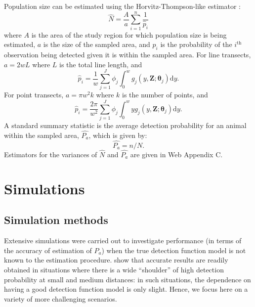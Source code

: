 \documentclass[useAMS,referee,usenatbib]{biom}
\begin{document}
Population size can be estimated using the Horvitz-Thompson-like estimator \citep{Marques:2003vb}:
\begin{equation}
\label{e:popsize}
\hat{N}=\frac{A}{a}\sum_{i=1}^n \frac{1}{\hat {p}_i}
\end{equation}
where $A$ is the area of the study region for which population size is being estimated, $a$ is the size of the sampled area, and $p_i$ is the probability of the $i^\text{th}$ observation being detected given it is within the sampled area.  For line transects, $a=2wL$ where $L$ is the total line length, and 
\begin{equation*}
\hat{p}_i = \frac{1}{w} \sum_{j=1}^J \phi_j \int_0^w  g_j(y,\mathbf{Z}; \bm{\theta}_j) \text{d}y.
\end{equation*}
For point transects, $a=\pi w^2 k$ where $k$ is the number of points, and 
\begin{equation*}
\hat{p}_i = \frac{2\pi}{w^2} \sum_{j=1}^J \phi_j \int_0^w  y g_j(y,\mathbf{Z}; \bm{\theta}_j) \text{d}y.
\end{equation*}
A standard summary statistic is the average detection probability for an animal within the sampled area, $\hat{P_a}$, which is given by:
\begin{equation*}
\hat{P_a} = n/N.
\end{equation*}
Estimators for the variances of $\hat{N}$ and $\hat{P_a}$ are given in Web Appendix C.

\section{Simulations}
\label{s:sims}

\subsection{Simulation methods}

Extensive simulations were carried out to investigate performance (in terms of the accuracy of estimation of $P_a$) when the true detection function model is not known to the estimation procedure. 
 \cite{Buckland:2001vm} show that accurate results are readily obtained in situations where there is a wide ``shoulder'' of high detection probability at small and medium distances: in such situations, the dependence on having a good detection function model is only slight.  Hence, we focus here on a variety of more challenging scenarios.
\end{document}

